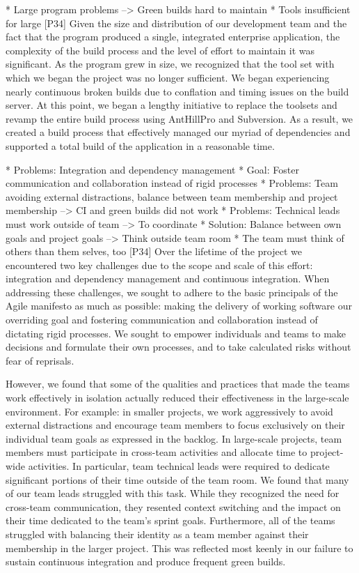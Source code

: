 \documentclass[preprint,authoryear,12pt]{elsarticle}
\begin{document}
* Large program problems --> Green builds hard to maintain
* Tools insufficient for large
[P34]
Given the size and distribution of our development team and the fact that the
program produced a single, integrated enterprise application, the complexity of
the build process and the level of effort to maintain it was significant.   As
the program grew in size, we recognized that the tool set with which we began
the project was no longer sufficient.  We began experiencing nearly continuous
broken builds due to conflation and timing issues on the build server.  At this
point, we began a lengthy initiative to replace the toolsets and revamp the
entire build process using AntHillPro and Subversion.  As a result, we created a
build process that effectively managed our myriad of dependencies and supported
a total build of the application in a reasonable time.


* Problems: Integration and dependency management
* Goal: Foster communication and collaboration instead of rigid processes
* Problems: Team avoiding external distractions, balance between team membership and project membership --> CI and green builds did not work
* Problems: Technical leads must work outside of team --> To coordinate
* Solution: Balance between own goals and project goals --> Think outside team room
* The team must think of others than them selves, too
[P34]
Over the lifetime of the project we encountered two key challenges due to the
scope and scale of this effort: integration and dependency management and
continuous integration. When addressing these challenges, we sought to adhere to
the basic principals of the Agile manifesto as much as possible: making the
delivery of working software our overriding goal and fostering communication and
collaboration instead of dictating rigid processes. We sought to empower
individuals and teams to make decisions and formulate their own processes, and
to take calculated risks without fear of reprisals.

However, we found that some of the qualities and practices that made the teams
work effectively in isolation actually reduced their effectiveness in the
large-scale environment.
For example: in smaller projects, we work aggressively to avoid external
distractions and encourage team members to focus exclusively on their individual
team goals as expressed in the backlog.  In large-scale projects, team members
must participate in cross-team activities and allocate time to project-wide
activities.  In particular, team technical leads were required to dedicate
significant portions of their time outside of the team room.  We found that many
of our team leads struggled with this task.  While they recognized the need for
cross-team communication, they resented context switching and the impact on
their time dedicated to the team’s sprint goals.
Furthermore, all of the teams struggled with balancing their identity as a team
member against their membership in the larger project. This was reflected most
keenly in our failure to sustain continuous integration and produce frequent
green builds.
\end{document}

